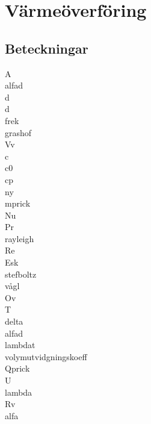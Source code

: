 \chapter{Värmeöverföring}
\section*{Beteckningar}
\acrfull{A}\\
\acrfull{alfad}\\
\acrfull{d}\\
\acrfull{d}\\
\acrfull{frek}\\
\acrfull{grashof}\\
\acrfull{Vv}\\
\acrfull{c}\\
\acrfull{c0}\\
\acrfull{cp}\\
\acrfull{ny}\\
\acrfull{mprick}\\
\acrfull{Nu}\\
\acrfull{Pr}\\
\acrfull{rayleigh}\\
\acrfull{Re}\\
\acrfull{Esk}\\
\acrfull{stefboltz}\\
\acrfull{vågl}\\
\acrfull{Ov}\\
\acrfull{T}\\
\acrfull{delta}\\
\acrfull{alfad}\\
\acrfull{lambdat} \\
\acrfull{volymutvidgningskoeff}\\
\acrfull{Qprick}\\
\acrfull{U}\\
\acrfull{lambda}\\
\acrfull{Rv}\\
\acrfull{alfa}

